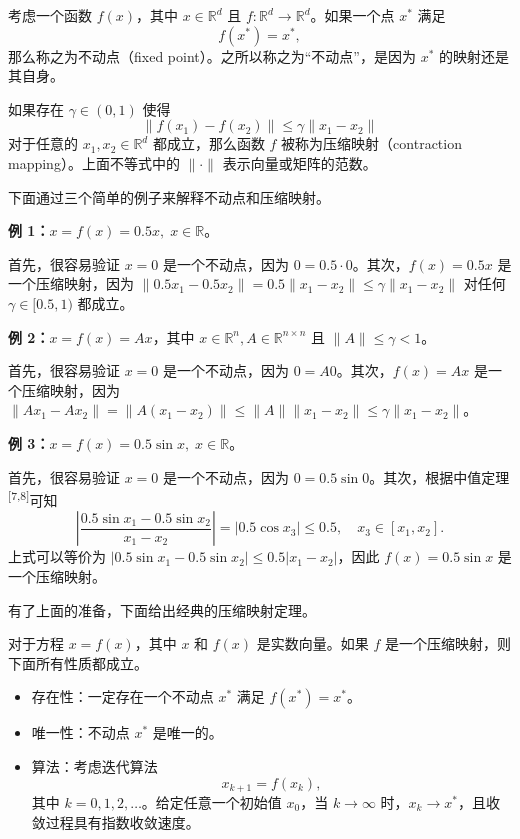 考虑一个函数 $f(x)$，其中 $x \in \mathbb{R}^d$ 且 $f: \mathbb{R}^d \to \mathbb{R}^d$。如果一个点 $x^*$ 满足
\begin{equation}
  f(x^*) = x^*,
\end{equation}
那么称之为不动点（fixed point）。之所以称之为“不动点”，是因为 $x^*$ 的映射还是其自身。

如果存在 $\gamma \in (0,1)$ 使得
\begin{equation}
  \| f(x_1) - f(x_2) \| \leqslant \gamma \| x_1 - x_2 \|
\end{equation}
对于任意的 $x_1, x_2 \in \mathbb{R}^d$ 都成立，那么函数 $f$ 被称为压缩映射（contraction mapping）。上面不等式中的 $\| \cdot \|$ 表示向量或矩阵的范数。

下面通过三个简单的例子来解释不动点和压缩映射。

\begin{example}[三个简单例子]
\label{ex:rl-contraction-three}
\textbf{例 1：}$x = f(x) = 0.5x, \; x \in \mathbb{R}$。

首先，很容易验证 $x = 0$ 是一个不动点，因为 $0 = 0.5 \cdot 0$。其次，$f(x) = 0.5x$ 是一个压缩映射，因为 $\|0.5 x_1 - 0.5 x_2\| = 0.5 \|x_1 - x_2\| \leqslant \gamma \|x_1 - x_2\|$ 对任何 $\gamma \in [0.5, 1)$ 都成立。

\textbf{例 2：}$x = f(x) = A x$，其中 $x \in \mathbb{R}^n, A \in \mathbb{R}^{n \times n}$ 且 $\|A\| \leqslant \gamma < 1$。

首先，很容易验证 $x = 0$ 是一个不动点，因为 $0 = A 0$。其次，$f(x) = A x$ 是一个压缩映射，因为 $\|A x_1 - A x_2\| = \|A(x_1 - x_2)\| \leqslant \|A\| \|x_1 - x_2\| \leqslant \gamma \|x_1 - x_2\|$。

\textbf{例 3：}$x = f(x) = 0.5 \sin x, \; x \in \mathbb{R}$。

首先，很容易验证 $x = 0$ 是一个不动点，因为 $0 = 0.5 \sin 0$。其次，根据中值定理\textsuperscript{[7,8]}可知
\begin{equation}
  \left| \frac{0.5 \sin x_1 - 0.5 \sin x_2}{x_1 - x_2} \right| = |0.5 \cos x_3| \leqslant 0.5, \quad x_3 \in [x_1, x_2].
\end{equation}
上式可以等价为 $|0.5 \sin x_1 - 0.5 \sin x_2| \leqslant 0.5 |x_1 - x_2|$，因此 $f(x) = 0.5 \sin x$ 是一个压缩映射。
\end{example}

有了上面的准备，下面给出经典的压缩映射定理。

\begin{theorem}[压缩映射定理]
\label{thm:rl-contraction}
对于方程 $x = f(x)$，其中 $x$ 和 $f(x)$ 是实数向量。如果 $f$ 是一个压缩映射，则下面所有性质都成立。
\begin{itemize}
  \item 存在性：一定存在一个不动点 $x^*$ 满足 $f(x^*) = x^*$。
  \item 唯一性：不动点 $x^*$ 是唯一的。
  \item 算法：考虑迭代算法
  \begin{equation}
    x_{k+1} = f(x_k),
  \end{equation}
  其中 $k = 0, 1, 2, \ldots$。给定任意一个初始值 $x_0$，当 $k \to \infty$ 时，$x_k \to x^*$，且收敛过程具有指数收敛速度。
\end{itemize}
\end{theorem}

